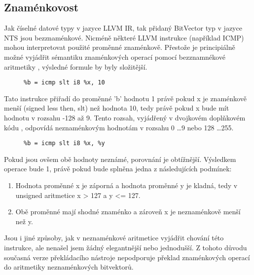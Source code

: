\documentclass{fithesis2}
\begin{document}
\subsection{Znaménkovost}
Jak číselné datové typy v jazyce LLVM IR, tak přidaný BitVector typ v jazyce NTS jsou bezznaménkové. Nicméně některé LLVM instrukce (například ICMP) mohou interpretovat použité proměnné znaménkově. Přestože je principiálně možné vyjádřit sémantiku znaménkových operací pomocí bezznamnékové aritmetiky , výsledné formule by byly složitější. 
\begin{figure}[h!]
\begin{lstlisting}
%b = icmp slt i8 %x, 10
\end{lstlisting}
\end{figure}
Tato instrukce přiřadí do proměnné 'b' hodnotu 1 právě pokud x je znaménkově menší (signed less then, slt) než hodnota 10, tedy právě pokud x bude mít hodnotu v rozsahu -128 až 9. Tento rozsah, vyjádřený v dvojkovém doplňkovém kódu , odpovídá neznaménkovým hodnotám v rozsahu 0 \ldots 9 nebo 128 \ldots 255. 

\begin{figure}[h!]
\begin{lstlisting}
%b = icmp slt i8 %x, %y
\end{lstlisting}
\end{figure}

Pokud jsou ovšem obě hodnoty neznámé, porovnání je obtížnější. Výsledkem operace bude 1, právě pokud bude splněna jedna z následujících podmínek:

\begin{enumerate}
\item Hodnota proměnné x je záporná a hodnota proměnné y je kladná, tedy v unsigned aritmetice x > 127 a y <= 127.
\item Obě proměnné mají shodné znaménko a zároveň x je neznaménkově menší než y.
\end{enumerate}

Jsou i jiné způsoby, jak v neznaménkové aritmetice vyjádřit chování této instrukce, ale nenašel jsem žádný elegantnější nebo jednodušší. Z tohoto důvodu současná verze překládacího nástroje nepodporuje překlad znaménkových operací do aritmetiky neznaménkových bitvektorů.
\end{document}
